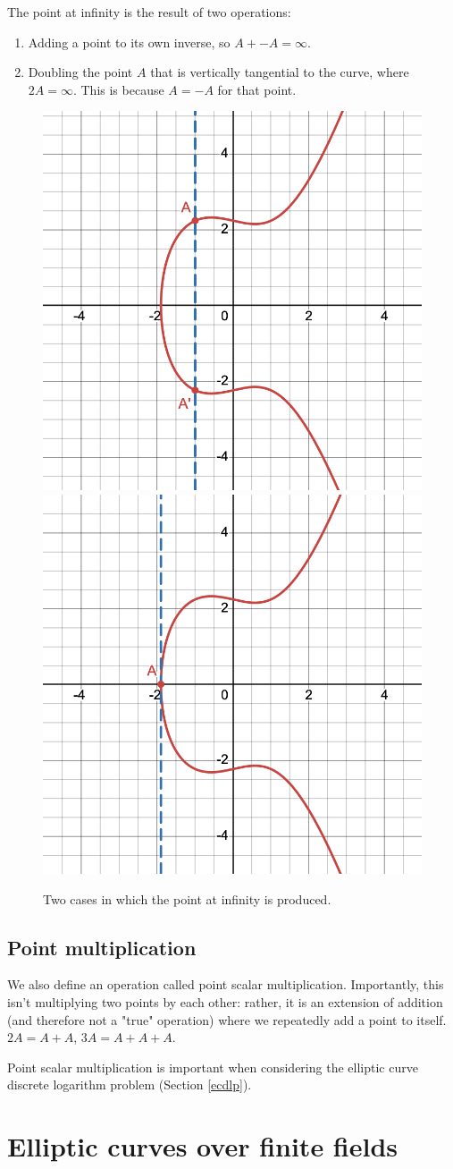 \documentclass[a4paper]{article}
\begin{document}
The point at infinity is the result of two operations:
\begin{enumerate}
    \item Adding a point to its own inverse, so $A + -A = \infty$.
    \item Doubling the point $A$ that is vertically tangential to the curve, where $2A = \infty$. This is because $A = -A$ for that point.
\end{enumerate}

\begin{figure}[h]
    \centering
    \includegraphics[width=0.3\linewidth]{images/infty-inverse.png}
    \includegraphics[width=0.3\linewidth]{images/infty-tangent.png}
    \caption{Two cases in which the point at infinity is produced.}
    \label{fig:infinity}
\end{figure}

\subsection{Point multiplication}\label{mul}

We also define an operation called point scalar multiplication. Importantly, this isn't multiplying two points by each other: rather, it is an extension of addition (and therefore not a "true" operation) where we repeatedly add a point to itself. $2A = A + A$, $3A = A + A + A$.\cite{guide}

Point scalar multiplication is important when considering the elliptic curve discrete logarithm problem (Section \ref{ecdlp}).


\section{Elliptic curves over finite fields}
\end{document}
